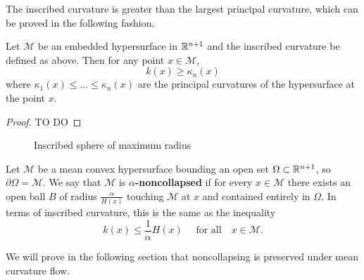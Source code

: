 The inscribed curvature is greater than the largest principal curvature, which can be proved in the following fashion. 
\newpage
\begin{lemma}
    Let $ \mathcal{M} $ be an embedded hypersurface in $ \mathbb{R}^{n+1} $ and the inscribed curvature be defined as above. Then for any point $ x \in \mathcal{M} $,
    \[ k(x) \ge \kappa_{n}(x) \]
    where $ \kappa_{1}(x) \le \ldots \le \kappa_{n}(x) $ are the principal curvatures of the hypersurface at the point $ x  $.
\end{lemma}
\begin{proof}
    TO DO
\end{proof}
\begin{figure}[h]
    \centering
    \caption{Inscribed sphere of maximum radius}
\end{figure}

\begin{defn}
    Let $ \mathcal{M} $ be a mean convex hypersurface bounding an open set $ \Omega \subset \mathbb{R}^{n+1}$, so $ \partial \Omega = \mathcal{M} $. We say that $ \mathcal{M} $ is \textbf{$ \alpha $-noncollapsed}  if for every $ x \in \mathcal{M} $ there exists an open ball $ B $ of radius $ \frac{\alpha}{H(x)} $ touching $ \mathcal{M} $ at $ x $ and contained entirely in $ \Omega $. In terms of inscribed curvature, this is the same as the inequality \begin{equation}
        k(x) \le \frac{1}{\alpha} H(x) \quad \text{ for all} \quad x \in \mathcal{M}.
    \end{equation}
\end{defn}
We will prove in the following section that noncollapsing is preserved under mean curvature flow.

